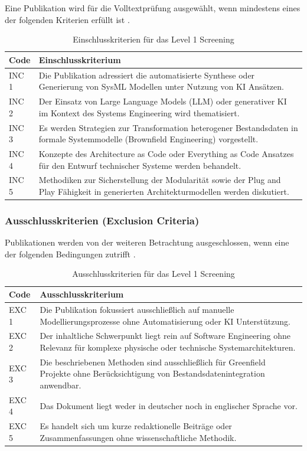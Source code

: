 Eine Publikation wird für die Volltextprüfung ausgewählt, wenn mindestens eines der folgenden Kriterien erfüllt ist \cite{Higgins.2019b}.

\begin{table}[h]
\centering
\begin{tabular}{|l|p{10cm}|}
\hline
\textbf{Code} & \textbf{Einschlusskriterium} \\ \hline
INC 1 & Die Publikation adressiert die automatisierte Synthese oder Generierung von SysML Modellen unter Nutzung von KI Ansätzen. \\ \hline
INC 2 & Der Einsatz von Large Language Models (LLM) oder generativer KI im Kontext des Systems Engineering wird thematisiert. \\ \hline
INC 3 & Es werden Strategien zur Transformation heterogener Bestandsdaten in formale Systemmodelle (Brownfield Engineering) vorgestellt. \\ \hline
INC 4 & Konzepte des Architecture as Code oder Everything as Code Ansatzes für den Entwurf technischer Systeme werden behandelt. \\ \hline
INC 5 & Methodiken zur Sicherstellung der Modularität sowie der Plug and Play Fähigkeit in generierten Architekturmodellen werden diskutiert. \\ \hline
\end{tabular}
\caption{Einschlusskriterien für das Level 1 Screening}
\label{tab:inc_criteria}
\end{table}
\newpage
\subsubsection{Ausschlusskriterien (Exclusion Criteria)}

Publikationen werden von der weiteren Betrachtung ausgeschlossen, wenn eine der folgenden Bedingungen zutrifft \cite{Petticrew.2012}.

\begin{table}[h]
\centering
\begin{tabular}{|l|p{10cm}|}
\hline
\textbf{Code} & \textbf{Ausschlusskriterium} \\ \hline
EXC 1 & Die Publikation fokussiert ausschließlich auf manuelle Modellierungsprozesse ohne Automatisierung oder KI Unterstützung. \\ \hline
EXC 2 & Der inhaltliche Schwerpunkt liegt rein auf Software Engineering ohne Relevanz für komplexe physische oder technische Systemarchitekturen. \\ \hline
EXC 3 & Die beschriebenen Methoden sind ausschließlich für Greenfield Projekte ohne Berücksichtigung von Bestandsdatenintegration anwendbar. \\ \hline
EXC 4 & Das Dokument liegt weder in deutscher noch in englischer Sprache vor. \\ \hline
EXC 5 & Es handelt sich um kurze redaktionelle Beiträge oder Zusammenfassungen ohne wissenschaftliche Methodik. \\ \hline
\end{tabular}
\caption{Ausschlusskriterien für das Level 1 Screening}
\label{tab:exc_criteria}
\end{table}